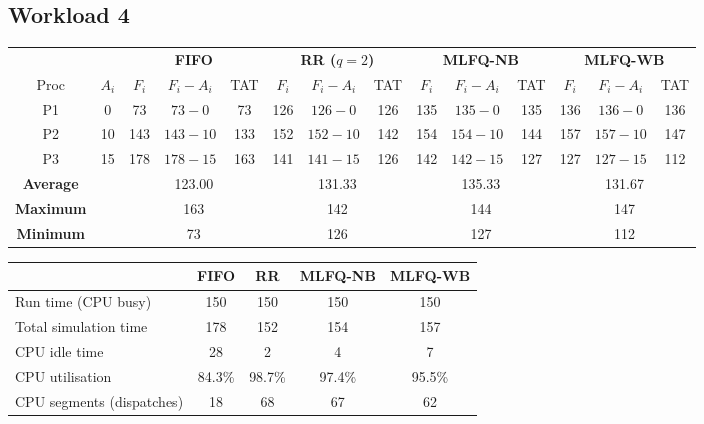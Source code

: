 \documentclass[11pt,a4paper]{article}
\begin{document}
\subsection{Workload 4}
\begin{center}\footnotesize\setlength{\tabcolsep}{4pt}
\begin{tabular}{cccccccccccccc}\toprule
& & \multicolumn{3}{c}{\textbf{FIFO}} & \multicolumn{3}{c}{\textbf{RR ($q=2$)}} & \multicolumn{3}{c}{\textbf{MLFQ-NB}} & \multicolumn{3}{c}{\textbf{MLFQ-WB}} \\
\cmidrule(lr){3-5}\cmidrule(lr){6-8}\cmidrule(lr){9-11}\cmidrule(lr){12-14}
Proc & $A_i$ & $F_i$ & $F_i-A_i$ & TAT & $F_i$ & $F_i-A_i$ & TAT & $F_i$ & $F_i-A_i$ & TAT & $F_i$ & $F_i-A_i$ & TAT \\\midrule
P1 & 0 & 73 & $73-0$ & 73 & 126 & $126-0$ & 126 & 135 & $135-0$ & 135 & 136 & $136-0$ & 136 \\
P2 & 10 & 143 & $143-10$ & 133 & 152 & $152-10$ & 142 & 154 & $154-10$ & 144 & 157 & $157-10$ & 147 \\
P3 & 15 & 178 & $178-15$ & 163 & 141 & $141-15$ & 126 & 142 & $142-15$ & 127 & 127 & $127-15$ & 112 \\
\midrule
\textbf{Average} & & \multicolumn{3}{c}{123.00} & \multicolumn{3}{c}{131.33} & \multicolumn{3}{c}{135.33} & \multicolumn{3}{c}{131.67} \\
\textbf{Maximum} & & \multicolumn{3}{c}{163} & \multicolumn{3}{c}{142} & \multicolumn{3}{c}{144} & \multicolumn{3}{c}{147} \\
\textbf{Minimum} & & \multicolumn{3}{c}{73} & \multicolumn{3}{c}{126} & \multicolumn{3}{c}{127} & \multicolumn{3}{c}{112} \\
\bottomrule\end{tabular}\end{center}
\begin{center}\footnotesize\begin{tabular}{lcccc}\toprule
& \textbf{FIFO} & \textbf{RR} & \textbf{MLFQ-NB} & \textbf{MLFQ-WB}\\\midrule
Run time (CPU busy) & 150 & 150 & 150 & 150 \\
Total simulation time & 178 & 152 & 154 & 157 \\
CPU idle time & 28 & 2 & 4 & 7 \\
CPU utilisation & 84.3\% & 98.7\% & 97.4\% & 95.5\% \\
CPU segments (dispatches) & 18 & 68 & 67 & 62 \\
\bottomrule\end{tabular}\end{center}
\end{document}
